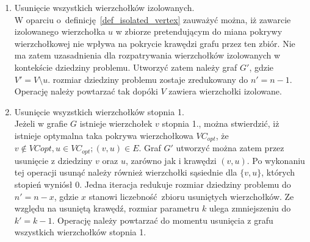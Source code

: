 \begin{enumerate}
  \item Usunięcie wszystkich wierzchołków izolowanych. \\
    W oparciu o~definicję~\ref{def_isolated_vertex} zauważyć można, iż zawarcie
    izolowanego wierzchołka $u$ w zbiorze pretendującym do miana pokrywy
    wierzchołkowej nie wpływa na pokrycie krawędzi grafu przez ten zbiór.
    Nie ma zatem uzasadnienia dla rozpatrywania wierzchołków izolowanych w
    kontekście dziedziny problemu.
    Utworzyć zatem należy graf $G\prime$, gdzie $V\prime = V
    \setminus u$.
    rozmiar dziedziny problemu zostaje zredukowany do $n\prime=n-1$.
    Operację należy powtarzać tak dopóki $V$ zawiera wierzchołki izolowane.

  \item Usunięcie wsyzstkich wierzchołków stopnia 1.\\
    Jeżeli w grafie $G$ istnieje wierzchołek $v$ stopnia 1., można 
    stwierdzić, iż istnieje optymalna taka pokrywa wierzchołkowa $VC_{opt}$, że
    $v \notin VC{opt}, u \in VC_{opt}; (v,u) \in E$.
    Graf $G\prime$ utworzyć można zatem przez usunięcie z dziedziny $v$ oraz
    $u$, zarówno jak i krawędzi $(v,u)$.
    Po wykonaniu tej operacji usunąć należy również wierzchołki sąsiednie dla
    $\{v,u\}$, których stopień wyniósł 0.
    Jedna iteracja redukuje rozmiar dziedziny problemu do $n\prime=n-x$, gdzie
    $x$ stanowi liczebność~zbioru usuniętych wierzchołków.
    Ze względu na usuniętą krawędź, rozmiar parametru $k$ ulega zmniejszeniu do
    $k\prime=k-1$.
    Operację należy powtarzać do momentu usunięcia z grafu wszystkich
    wierzchołków stopnia 1.


\end{enumerate}
